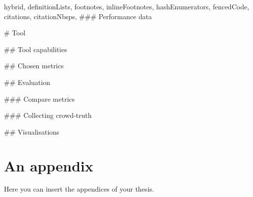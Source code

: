 \documentclass[
  digital, %
  table,   %
  lof,     %
  lot,     %
]{fithesis3}
\begin{document}
\begin{markdown*}{%
  hybrid,
  definitionLists,
  footnotes,
  inlineFootnotes,
  hashEnumerators,
  fencedCode,
  citations,
  citationNbsps,
}
### Performance data


%
%

# Tool

## Tool capabilities

## Chosen metrics

## Evaluation

### Compare metrics

### Collecting crowd-truth

## Visualisations

\fi %

\end{markdown*}

  \makeatletter\thesis@blocks@clear\makeatother
  \printindex

\appendix %
\chapter{An appendix}
Here you can insert the appendices of your thesis.
\end{document}

